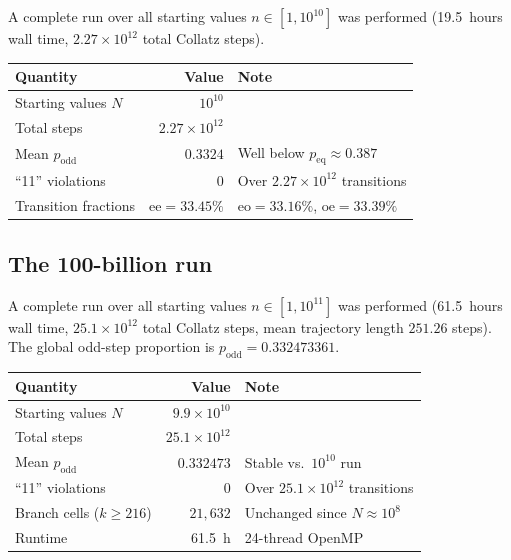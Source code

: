 \documentclass[manuscript]{aomart}
\theoremstyle{plain}
\theoremstyle{definition}
\theoremstyle{remark}
\numberwithin{equation}{section}
\begin{document}
A complete run over all starting values $n \in [1, 10^{10}]$ was
performed (19.5~hours wall time, $2.27 \times 10^{12}$ total Collatz
steps).

\begin{center}
\renewcommand{\arraystretch}{1.3}
\begin{tabular}{lrl}
  \toprule
  \textbf{Quantity} & \textbf{Value} & \textbf{Note} \\
  \midrule
  Starting values $N$ & $10^{10}$ & \\
  Total steps & $2.27 \times 10^{12}$ & \\
  Mean $p_{\mathrm{odd}}$ & $0.3324$ & Well below
    $p_{\mathrm{eq}} \approx 0.387$ \\
  ``11'' violations & $0$ & Over $2.27 \times 10^{12}$ transitions \\
  Transition fractions & $\mathrm{ee} = 33.45\%$ &
    $\mathrm{eo} = 33.16\%$, $\mathrm{oe} = 33.39\%$ \\
  \bottomrule
\end{tabular}
\end{center}

\subsection{The 100-billion run}

A complete run over all starting values $n \in [1, 10^{11}]$ was
performed (61.5~hours wall time, $25.1 \times 10^{12}$ total
Collatz steps, mean trajectory length $251.26$ steps).  The global
odd-step proportion is $p_{\mathrm{odd}} = 0.332473361$.

\begin{center}
\renewcommand{\arraystretch}{1.3}
\begin{tabular}{lrl}
  \toprule
  \textbf{Quantity} & \textbf{Value} & \textbf{Note} \\
  \midrule
  Starting values $N$ & $9.9\!\times\!10^{10}$ & \\
  Total steps & $25.1 \times 10^{12}$ & \\
  Mean $p_{\mathrm{odd}}$ & $0.332473$ &
    Stable vs.\ $10^{10}$ run \\
  ``11'' violations & $0$ & Over $25.1 \times 10^{12}$ transitions \\
  Branch cells ($k \ge 216$) & $21{,}632$ &
    Unchanged since $N \approx 10^8$ \\
  Runtime & 61.5~h & 24-thread OpenMP \\
  \bottomrule
\end{tabular}
\end{center}
\end{document}
